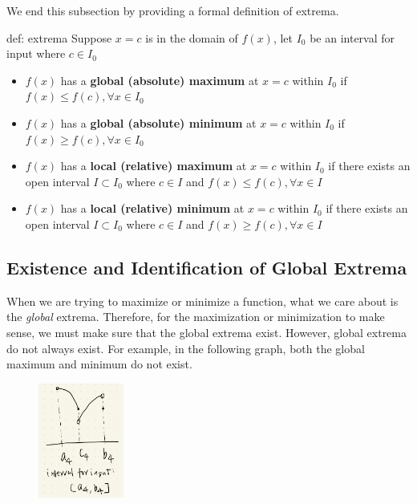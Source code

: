 We end this subsection by providing a formal definition of extrema.

\begin{defi}[Extrema]{def: extrema}
    Suppose $x=c$ is in the domain of $f(x)$, let $I_0$ be an interval for input where $c \in I_0$
    \begin{itemize}
        \item $f(x)$ has a \textbf{global (absolute) maximum} at $x=c$ within $I_0$ if $f(x) \le f(c), \forall x \in I_0$ 
        \item $f(x)$ has a \textbf{global (absolute) minimum} at $x=c$ within $I_0$ if $f(x) \ge f(c), \forall x \in I_0$ 
        \\
        \item $f(x)$ has a \textbf{local (relative) maximum} at $x=c$ within $I_0$ if there exists an open interval $I \subset I_0$ where $c \in I$ and $f(x) \le f(c), \forall x \in I$ 
        \item $f(x)$ has a \textbf{local (relative) minimum} at $x=c$ within $I_0$ if there exists an open interval $I \subset I_0$ where $c \in I$ and $f(x) \ge f(c), \forall x \in I$ 
    \end{itemize}
\end{defi}

\subsection{Existence and Identification of Global Extrema}

When we are trying to maximize or minimize a function, what we care about is the \textit{global} extrema.  Therefore, for the maximization or minimization to make sense, we must make sure that the global extrema exist.  However, global extrema do not always exist.  For example, in the following graph, both the global maximum and minimum do not exist.

\begin{figure}[ht]
    \centering
    \includegraphics[width = 0.25\textwidth]{figures/chap 05/global_extrema_dne.png}
    \label{fig: global_extrema_dne}
\end{figure}

